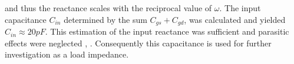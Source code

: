 and thus the reactance scales with the reciprocal value of $\omega$.
The input capacitance $C_{in}$ determined by the sum $C_{gs} + C_{gd}$, was calculated and yielded $C_{in}\approx 20 pF$.
This estimation of the input reactance was sufficient and parasitic effects were neglected \cite{CakaZabelliLimaniEtAl2007}, \cite{ZhangZhangTangEtAl2014}.
Consequently this capacitance is used for further investigation as a load impedance.
%
%
%


